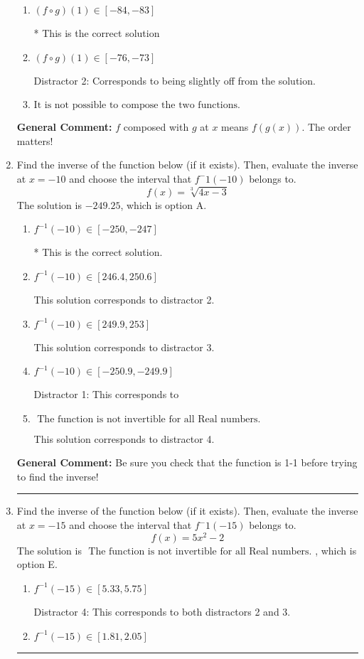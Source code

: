 \documentclass{extbook}[14pt]
\newcommand{\litem}[1]{\item #1

\rule{\textwidth}{0.4pt}}
\begin{document}
\begin{enumerate}
{\begin{enumerate}[label=\Alph*.]
 Distractor 3: Corresponds to being slightly off from the solution.
\item \( (f \circ g)(1) \in [-84, -83] \)

* This is the correct solution
\item \( (f \circ g)(1) \in [-76, -73] \)

 Distractor 2: Corresponds to being slightly off from the solution.
\item \( \text{It is not possible to compose the two functions.} \)


\end{enumerate}

\textbf{General Comment:} $f$ composed with $g$ at $x$ means $f(g(x))$. The order matters!
}
\litem{
Find the inverse of the function below (if it exists). Then, evaluate the inverse at $x = -10$ and choose the interval that $f^-1(-10)$ belongs to.
\[ f(x) = \sqrt[3]{4 x - 3} \]The solution is \( -249.25 \), which is option A.\begin{enumerate}[label=\Alph*.]
\item \( f^{-1}(-10) \in [-250, -247] \)

* This is the correct solution.
\item \( f^{-1}(-10) \in [246.4, 250.6] \)

 This solution corresponds to distractor 2.
\item \( f^{-1}(-10) \in [249.9, 253] \)

 This solution corresponds to distractor 3.
\item \( f^{-1}(-10) \in [-250.9, -249.9] \)

 Distractor 1: This corresponds to 
\item \( \text{ The function is not invertible for all Real numbers. } \)

 This solution corresponds to distractor 4.
\end{enumerate}

\textbf{General Comment:} Be sure you check that the function is 1-1 before trying to find the inverse!
}
\litem{
Find the inverse of the function below (if it exists). Then, evaluate the inverse at $x = -15$ and choose the interval that $f^-1(-15)$ belongs to.
\[ f(x) = 5 x^2 - 2 \]The solution is \( \text{ The function is not invertible for all Real numbers. } \), which is option E.\begin{enumerate}[label=\Alph*.]
\item \( f^{-1}(-15) \in [5.33, 5.75] \)

 Distractor 4: This corresponds to both distractors 2 and 3.
\item \( f^{-1}(-15) \in [1.81, 2.05] \)


\end{enumerate}}
\end{enumerate}
\end{document}
